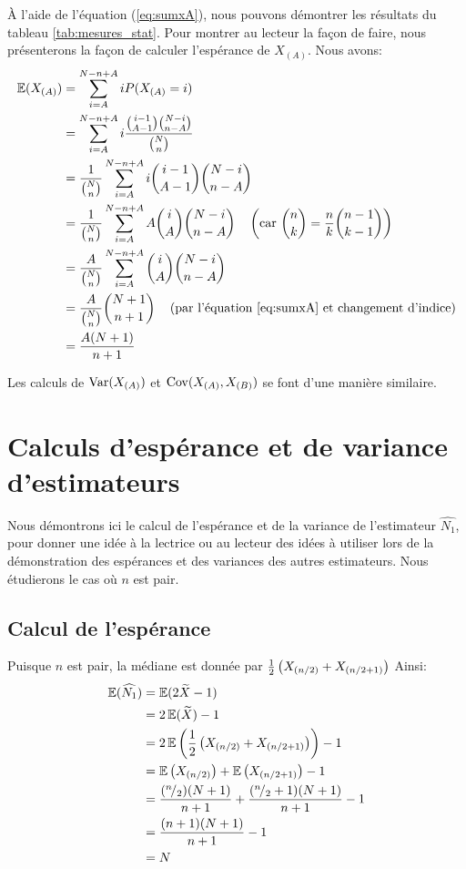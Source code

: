 \documentclass[10pt]{article}
\newcommand*\rfrac[2]{{}^{#1}\!/_{#2}}
\begin{document}
À l'aide de l'équation (\ref{eq:sumxA}), nous pouvons démontrer les
résultats du tableau \ref{tab:mesures_stat}. Pour montrer au lecteur la
façon de faire, nous présenterons la façon de calculer l'espérance de
\(X_{(A)}\). Nous avons: \begin{align}
\operatorname{\mathbb{E}}(X_{(A)}) &= \sum_{i=A}^{N-n+A} iP(X_{(A)}=i) \nonumber\\
&= \sum_{i=A}^{N-n+A} i\dfrac{\binom{i-1}{A-1}\binom{N-i}{n-A}}{\binom{N}{n}} \nonumber\\
&= \dfrac{1}{\binom{N}{n}}\sum_{i=A}^{N-n+A} i\binom{i-1}{A-1}\binom{N-i}{n-A} \nonumber\\
&= \dfrac{1}{\binom{N}{n}}\sum_{i=A}^{N-n+A} A\binom{i}{A}\binom{N-i}{n-A} 
\quad\left(\text{car $\binom{n}{k}=\dfrac{n}{k}\binom{n-1}{k-1}$}\right) \nonumber\\
&= \dfrac{A}{\binom{N}{n}}\sum_{i=A}^{N-n+A} \binom{i}{A}\binom{N-i}{n-A} \nonumber\\
&= \dfrac{A}{\binom{N}{n}}\binom{N+1}{n+1} \quad\left(\text{par l'équation \ref{eq:sumxA} et changement d'indice}\right) \nonumber\\
&= \dfrac{A(N+1)}{n+1} \label{eq:esperancexA}
\end{align}

Les calculs de \(\operatorname{Var}(X_{(A)})\) et \(\operatorname{Cov}(X_{(A)},X_{(B)})\) se font
d'une manière similaire.

\hypertarget{calculs-desperance-et-de-variance-destimateurs}{%
\section{\texorpdfstring{Calculs d'espérance et de variance
d'estimateurs
\label{calculs_estimateurs}}{Calculs d'espérance et de variance d'estimateurs }}\label{calculs-desperance-et-de-variance-destimateurs}}

Nous démontrons ici le calcul de l'espérance et de la variance de
l'estimateur \(\widehat{N_1}\), pour donner une idée à la lectrice ou au
lecteur des idées à utiliser lors de la démonstration des espérances et
des variances des autres estimateurs. Nous étudierons le cas où \(n\)
est pair.

\hypertarget{calcul-de-lesperance}{%
\subsection{Calcul de l'espérance}\label{calcul-de-lesperance}}

Puisque \(n\) est pair, la médiane est donnée par
\(\frac{1}{2}\left(X_{\left(n/2\right)}+X_{\left(n/2+1\right)}\right)\) Ainsi: \begin{align*}
\esp(\widehat{N_1}) &= \esp(2\widetilde{X}-1) \\
&= 2\esp(\widetilde{X})-1 \\
&= 2\esp\lr{\frac{1}{2}\lr{X_{\lr{n/2}}+X_{\lr{n/2+1}}}}-1 \\
&= \esp\lr{X_{\lr{n/2}}}+\esp\lr{X_{\lr{n/2+1}}}-1 \\
&= \frac{(\rfrac{n}{2})(N+1)}{n+1}+ \frac{(\rfrac{n}{2}+1)(N+1)}{n+1}-1 \\
&= \frac{(n+1)(N+1)}{n+1}-1 \\
&= N
\end{align*}
\end{document}
